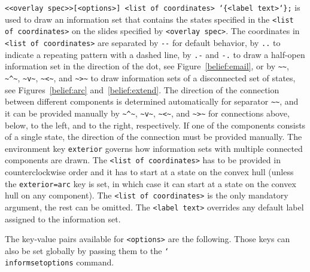 \documentclass{article}
\newenvironment{desc}{\itemize[leftmargin=50pt]}{\enditemize}
\def\macroarg#1#2{\item[\cmd{#1}] \hskip-2.5pt\texttt{#2}}
\renewcommand{\textbackslash}{\char`\\}
\def\cmd#1{\texttt{\color{cmd}\textbackslash#1}}
\def\leftbrace{\char`\{}
\def\rightbrace{\char`\}}
\def\arg#1{{\color{cmd}\leftbrace}{\color{black}#1}{\color{cmd}\rightbrace}}
\def\optarg[#1]{{\color{player1}[#1]}}
\begin{document}
\begin{desc}
\macroarg{informset}{<<overlay spec>>\optarg[<options>] <list of coordinates> \arg{<label text>};} is used to draw an information set that contains the states specified in the \texttt{<list of coordinates>} on the slides specified by \texttt{<overlay spec>}. The coordinates in \texttt{<list of coordinates>} are separated by \verb|--| for default behavior, by \texttt{..} to indicate a repeating pattern with a dashed line, by \texttt{.-} and \texttt{-.} to draw a half-open information set in the direction of the dot, see Figure~\ref{belief:email}, or by \verb|~~|, \verb|~^~|, \verb|~v~|, \verb|~<~|, and \verb|~>~| to draw information sets of a disconnected set of states, see Figures~\ref{belief:arc} and~\ref{belief:extend}. The direction of the connection between different components is determined automatically for separator \verb|~~|, and it can be provided manually by \verb|~^~|, \verb|~v~|, \verb|~<~|, and \verb|~>~| for connections above, below, to the left, and to the right, respectively. If one of the components consists of a single state, the direction of the connection must be provided manually. The environment key \texttt{exterior} governs how information sets with multiple connected components are drawn. 
%
The \texttt{<list of coordinates>} has to be provided in counterclockwise order and it has to start at a state on the convex hull (unless the \texttt{exterior=arc} key is set, in which case it can start at a state on the convex hull on any component). The \texttt{<list of coordinates>} is the only mandatory argument, the rest can be omitted. The \texttt{<label text>} overrides any default label assigned to the information set.
\end{desc}

\noindent The key-value pairs available for \texttt{<options>} are the following. Those keys can also be set globally by passing them to the \cmd{informsetoptions} command.
\end{document}

